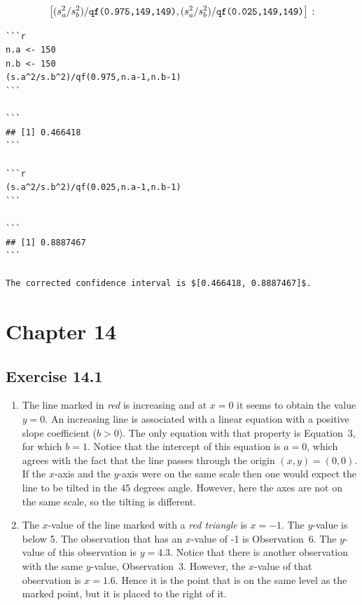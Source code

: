 \documentclass[
]{krantz}
\theoremstyle{definition}
\theoremstyle{definition}
\theoremstyle{definition}
\theoremstyle{remark}
\begin{document}
\[\big[(s_a^2/s_b^2)/\mbox{\texttt{qf(0.975,149,149)}} , (s_a^2/s_b^2)/\mbox{\texttt{qf(0.025,149,149)}}\big]\,:\]

\begin{verbatim}
```r
n.a <- 150
n.b <- 150
(s.a^2/s.b^2)/qf(0.975,n.a-1,n.b-1)
```

```
## [1] 0.466418
```

```r
(s.a^2/s.b^2)/qf(0.025,n.a-1,n.b-1)
```

```
## [1] 0.8887467
```

The corrected confidence interval is $[0.466418, 0.8887467]$.
\end{verbatim}

\hypertarget{chapter-14}{%
\section*{Chapter 14}\label{chapter-14}}


\hypertarget{exercise-14.1}{%
\subsection*{Exercise 14.1}\label{exercise-14.1}}


\begin{enumerate}
\def\labelenumi{\arabic{enumi}.}
\item
  The line marked in \emph{red} is
  increasing and at \(x=0\) it seems to obtain the value \(y=0\). An
  increasing line is associated with a linear equation with a positive
  slope coefficient (\(b > 0\)). The only equation with that property is
  Equation~3, for which \(b=1\). Notice that the intercept of this equation
  is \(a = 0\), which agrees with the fact that the line passes through the
  origin \((x,y) = (0,0)\). If the \(x\)-axis and the \(y\)-axis were on the
  same scale then one would expect the line to be tilted in the 45 degrees
  angle. However, here the axes are not on the same scale, so the tilting
  is different.
\item
  The \(x\)-value of the line marked
  with a \emph{red triangle} is \(x=-1\). The \(y\)-value is below 5. The
  observation that has an \(x\)-value of -1 is Observation~6. The \(y\)-value
  of this observation is \(y=4.3\). Notice that there is another observation
  with the same \(y\)-value, Observation~3. However, the \(x\)-value of that
  observation is \(x=1.6\). Hence it is the point that is on the same level
  as the marked point, but it is placed to the right of it.
\end{enumerate}
\end{document}
